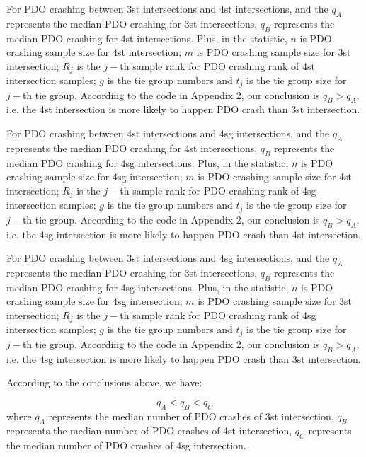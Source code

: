 \documentclass[11pt]{scrartcl} %
\begin{document}
\par

For PDO crashing between 3st intersections and 4st intersections, and the ${q_A}$ represents the median PDO crashing for 3st intersections, $q_B$ represents the median PDO crashing for 4st intersections. Plus, in the statistic, $n$ is PDO crashing sample size for 4st intersection; $m$ is PDO crashing sample size for 3st intersection; $R_j$ is the $j-$th sample rank for PDO crashing rank of 4st intersection samples; $g$ is the tie group numbers and $t_j$ is the tie group size for $j-$th tie group. According to the code in Appendix 2, our conclusion is ${{q_B} > {q_A}}$, i.e. the 4st intersection is more likely to happen PDO crash than 3st intersection.


\par

For PDO crashing between 4st intersections and 4sg intersections, and the ${q_A}$ represents the median PDO crashing for 4st intersections, $q_B$ represents the median PDO crashing for 4sg intersections. Plus, in the statistic, $n$ is PDO crashing sample size for 4sg intersection; $m$ is PDO crashing sample size for 4st intersection; $R_j$ is the $j-$th sample rank for PDO crashing rank of 4sg intersection samples; $g$ is the tie group numbers and $t_j$ is the tie group size for $j-$th tie group. According to the code in Appendix 2, our conclusion is ${{q_B} > {q_A}}$, i.e. the 4sg intersection is more likely to happen PDO crash than 4st intersection.

\par

For PDO crashing between 3st intersections and 4sg intersections, and the ${q_A}$ represents the median PDO crashing for 3st intersections, $q_B$ represents the median PDO crashing for 4sg intersections. Plus, in the statistic, $n$ is PDO crashing sample size for 4sg intersection; $m$ is PDO crashing sample size for 3st intersection; $R_j$ is the $j-$th sample rank for PDO crashing rank of 4sg intersection samples; $g$ is the tie group numbers and $t_j$ is the tie group size for $j-$th tie group. According to the code in Appendix 2, our conclusion is ${{q_B} > {q_A}}$, i.e. the 4sg intersection is more likely to happen PDO crash than 3st intersection.

\par

According to the conclusions above, we have:

\begin{equation*}
{q_A} < {q_B} < {q_C}
\end{equation*}
where $q_A$ represents the median number of PDO crashes of 3st intersection, $q_B$ represents the median number of PDO crashes of 4st intersection, $q_C$ represents the median number of PDO crashes of 4sg intersection.
\end{document}
